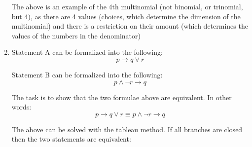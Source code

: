 \begin{enumerate}
The above is an example of the 4th multinomial (not binomial, or trinomial, but 4), as there are 4 values (choices, which determine the dimension of the multinomial) and there is a restriction on their amount (which determines the values of the numbers in the denominator)

\item
Statement A can be formalized into the following:
\[p \to q \lor r\]

Statement B can be formalized into the following:
\[p \land \neg r \to q\]

The task is to show that the two formulae above are equivalent. In other words:
\[p \to q \lor r \equiv p \land \neg r \to q\]

The above can be solved with the tableau method. If all branches are closed then the two statements are equivalent:


\end{enumerate}
